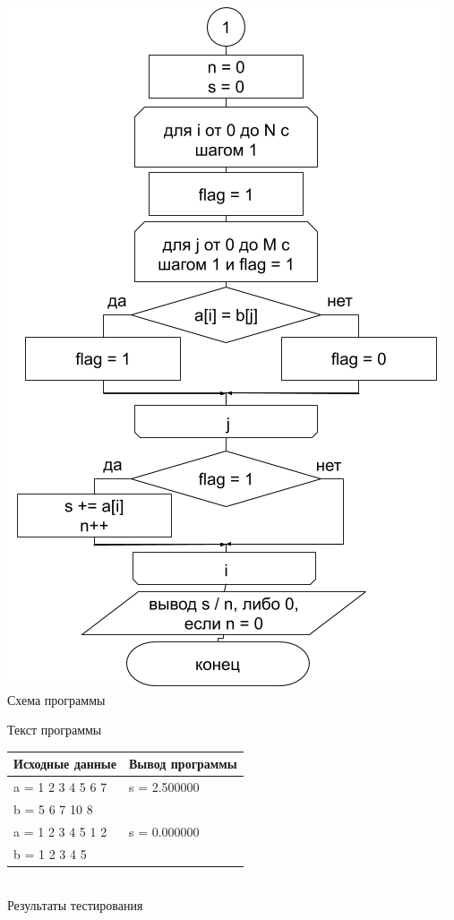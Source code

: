 \documentclass[a4paper,14pt]{extarticle}
\begin{document}
\begin{center}
\includegraphics[scale=0.6]{lab4-1-2.png}\\
Схема программы
\end{center}

\begin{center}
Текст программы\\
\vspace{0.6cm}
\begin{tabular}{|l|l|}
\hline
\multicolumn{1}{|c|}{Исходные данные}& \multicolumn{1}{|c|}{Вывод программы}\\
\hline
a = 1 2 3 4 5 6 7 & s = 2.500000 \\
b = 5 6 7 10 8 & \\
\hline
a = 1 2 3 4 5 1 2 & s = 0.000000 \\
b = 1 2 3 4 5 & \\ 
\hline
\end{tabular}\\
\vspace{0.3cm}
Результаты тестирования
\end{center}
\end{document}
